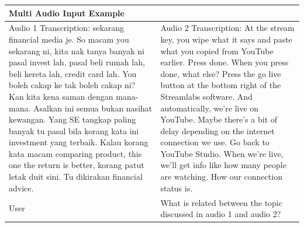 \documentclass[preprint]{article}
\begin{document}
\begin{table}[hbt]
  \setlength{\extrarowheight}{3pt}
  \renewcommand{\arraystretch}{1.5}
  \begin{tabular}{p{6.5cm} p{6.5cm}}
    \hline
    \textbf{Multi Audio Input Example}                                                                                                                                                                                                                                                                                                                                                                                                                                                                                                                                                                                                                                                                                                                                                                                                                                                                                                                                                                                         \\[3pt]
    \hline
    \hline
    Audio 1 Transcription: sekarang financial media je. So macam you sekarang ni, kita nak tanya banyak ni pasal invest lah, pasal beli rumah lah, beli kereta lah, credit card lah. You boleh cakap ke tak boleh cakap ni? Kan kita kena saman dengan mana-mana. Asalkan ini semua bukan nasihat kewangan. Yang SE tangkap paling banyak tu pasal bila korang kata ini investment yang terbaik. Kalau korang kata macam comparing product, this one the return is better, korang patut letak duit sini. Tu dikirakan financial advice. & Audio 2 Transcription: At the stream key, you wipe what it says and paste what you copied from YouTube earlier. Press done. When you press done, what else? Press the go live button at the bottom right of the Streamlabs software. And automatically, we're live on YouTube. Maybe there's a bit of delay depending on the internet connection we use. Go back to YouTube Studio. When we're live, we'll get info like how many people are watching. How our connection status is. \\
    \hline
    User                                                                                                                                                                                                                                                                                                                                                                                                                                                                                                                                & What is related between the topic discussed in audio 1 and audio 2?                                                                                                                                                                                                                                                                                                                                                                                                                  \\

\end{tabular}
\end{table}
\end{document}
